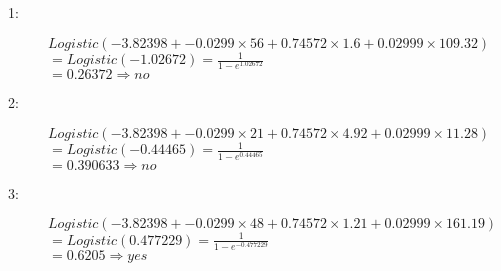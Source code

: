 \documentclass[nosolution]{ditpaper}
\begin{document}
\begin{enumerate}
\begin{answer}
		\begin{description}
		\item[1:] $Logistic(-3.82398+-0.0299\times56+0.74572\times1.6+0.02999\times109.32)$ \\
		$=Logistic(-1.02672) =\frac{1}{1-e^{1.02672}}$\\
		$=0.26372 \Rightarrow \textit{no}$
		\item[2:] $Logistic(-3.82398+-0.0299\times21+0.74572\times4.92+0.02999\times11.28)$ \\
		$=Logistic(-0.44465)  =\frac{1}{1-e^{0.44465}}$ \\
		$=0.390633 \Rightarrow \textit{no}$
		\item[3:] $Logistic(-3.82398+-0.0299\times48+0.74572\times1.21+0.02999\times161.19)$ \\
		$=Logistic(0.477229)   =\frac{1}{1-e^{-0.477229}}$ \\
		$=0.6205 \Rightarrow \textit{yes}$
		\end{description}
		\end{answer}
\end{enumerate}
\end{document}
